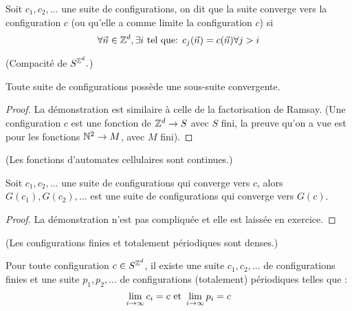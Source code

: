 \begin{definition}
	Soit $c_1,c_2, \ldots$ une suite de configurations, on dit que la suite converge vers
	la configuration $c$ (ou qu'elle a comme limite la configuration $c$) si
	$$ \forall \vec n \in \mathbb{Z}^d, \exists i \mbox{ tel que: } c_j(\vec n) = c(\vec n) \forall j > i$$
\end{definition}

\begin{prop}\label{prop:compact}(Compacité de $S^{\mathbb{Z}^d}.$)

	Toute suite de configurations possède une sous-suite convergente.
\end{prop}

\begin{proof}
	La démonstration est similaire à celle de la factorisation de Ramsay.
	(Une configuration $c $ est une fonction de $\mathbb{Z}^d \to S$ avec $S$ fini, la preuve qu'on a vue est pour les fonctions $\mathbb{N} ^ 2 \to M$, avec $M$ fini).
\end{proof}

\begin{prop}\label{prop:continues}(Les fonctions d'automates cellulaires sont continues.) 

Soit $c_1,c_2, \ldots$ une suite de configurations qui converge vers $c$,
	alors $G(c_1),G(c_2), \ldots$ est une suite de configurations qui converge vers $G(c)$.
\end{prop}

\begin{proof}
	La démonstration n'est pas compliquée et elle est laissée en exercice.
\end{proof}

\begin{prop}\label{prop:dense} (Les configurations finies et totalement périodiques sont denses.) 

Pour toute configuration $c \in S^{\mathbb{Z}^d}$, il existe une suite $c_1,c_2, \ldots$ de configurations finies et une suite  $p_1,p_2, \ldots$ de configurations (totalement) périodiques telles que : 
	$$ \lim_{i \to \infty} c_i = c \text{ et } \lim_{i \to \infty} p_i = c $$
\end{prop}

